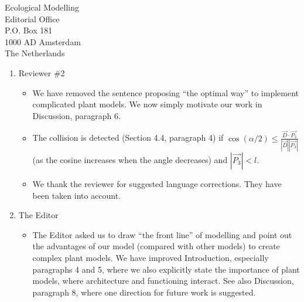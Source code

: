 \documentclass{letter}
\begin{document}
\begin{letter}{ Ecological Modelling \\ Editorial Office \\
               P.O. Box 181 \\ 1000 AD Amsterdam \\ The Netherlands}
\begin{enumerate}
\begin{itemize}
\begin{itemize}
  removed and we  now state the importance of  developing plant models
  where  architecture  and  functioning  interact  (see  also  changes
  required by the Editor).
\item First  sentence of the last  paragraph of the  first section was
  unclear  for the  reviewer. We  now use  the phrase  ``based  on the
  likeness   of   how  LIGNUM   and   L-systems  represent   branching
  structures''.
\item Regarding  Scots pine  example it is  now mentioned in  the text
  (Section 4, second paragraph) that the A records the branching order
  and that the extension continues after branching stops.
\item The second sentence in the Figure 2 is now in the text.
\item Appendix A the last rule  for Bend the argument for Pitch is now
  's' as it should.
\end{itemize}
\item We  have not labelled  the axis in  Figure 1. We think  the axis
  should be clear in the text and in the equations.
\item We gratefully thank the  reviewer for pointing out the errors in
  references. We have corrected the mistakes and falsehoods.
\end{itemize}
\item Reviewer \#2
\begin{itemize}
\item We  have removed the  sentence proposing ``the optimal  way'' to
  implement complicated plant models.  We now simply motivate our work
  in Discussion, paragraph 6.
\item  The  collision  is  detected  (Section  4.4,  paragraph  4)  if
  $\cos(\alpha/2)  \leq  \frac{{\vec  D}  \cdot {\vec  {P_3}}}  {|\vec
    D||\vec  {P_3}|}$   (as  the  cosine  increases   when  the  angle
  decreases) and $|\vec {P_3}| < l$.
\item We  thank the reviewer for suggested  language corrections. They
  have been taken into account.
\end{itemize}
\item The Editor
\begin{itemize}
\item The Editor asked us to  draw ``the front line'' of modelling and
  point out the  advantages of our model (compared  with other models)
  to  create complex  plant  models.  We  have improved  Introduction,
  especially paragraphs  4 and 5,  where we also explicitly  state the
  importance  of  plant  models,  where architecture  and  functioning
  interact. See also Discussion,  paragraph 8, where one direction for
  future work is suggested.
\end{itemize}
\end{enumerate}


\end{letter}
\end{document}

